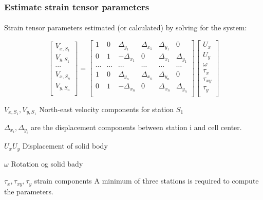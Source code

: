 \begin{frame}
 \frametitle{Estimate strain tensor parameters}
 \framesubtitle{}
 \label{ch2:}
 
 Strain tensor parameters estimated (or calculated) by solving for the system:
 
 \[
  \begin{bmatrix}
    V_{x,S_1} \\ 
    V_{y,S_1} \\ 
    \cdots \\ 
    V_{x,S_n} \\ 
    V_{y,S_n} \\ 
  \end{bmatrix}
  =
  \begin{bmatrix}
    1 & 0 & \Delta_{y_1}  & \Delta_{x_1} & \Delta_{y_1} & 0 \\
    0 & 1 & -\Delta_{x_1} &  0           & \Delta_{x_1} & \Delta_{y_1} \\
    \cdots & \cdots & \cdots & \cdots & \cdots & \cdots \\
    1 & 0 & \Delta_{y_n}  & \Delta_{x_n} & \Delta_{y_n} & 0 \\
    0 & 1 & -\Delta_{x_n} &  0           & \Delta_{x_n} & \Delta_{y_n} \\
  \end{bmatrix}
  \begin{bmatrix}
    U_{x} \\ 
    U_{y} \\ 
    \omega \\ 
    \tau_{x} \\ 
    \tau_{xy} \\ 
    \tau_{y} \\ 
  \end{bmatrix}
  \]
  
  $V_{x,S_1}, V_{y,S_1}$ North-east velocity components for station $S_1$
  
  $\Delta_{x_i}, \Delta_{y_i}$ are the displacement components between station i and cell center.
  
  $ U_{x} U_{y} $ Displacement of solid body
  
  $\omega$ Rotation og solid bady
  
  $ \tau_{x}, \tau_{xy}, \tau_{y} $ strain components
  A minimum of three stations is required to compute the parameters.
  
  

\end{frame}
\note{}

